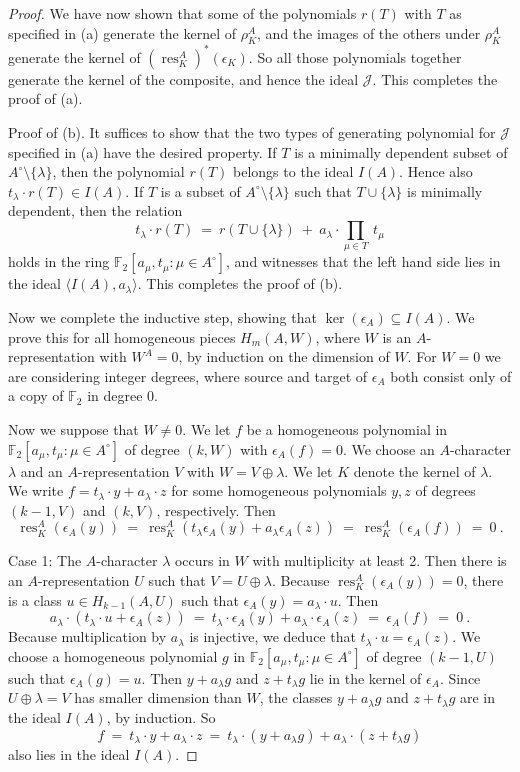 \documentclass[10pt,a4paper]{amsart}
\DeclareMathOperator{\res}{res}
\newcommand{\Jc}{{\mathcal J}}
\newcommand{\mF}{{\mathbb F}}
\newcommand{\td}[1]{\langle #1\rangle}
\begin{document}
\begin{proof}
  We have now shown that some of the polynomials $r(T)$ with $T$ as specified in (a)
  generate the kernel of $\rho^A_K$, and the images of the others under $\rho^A_K$
  generate the kernel of $(\res^A_K)^*(\epsilon_K)$. So all those polynomials
  together generate the kernel of the composite, and hence the ideal $\Jc$.
  This completes the proof of (a).\medskip

 
    Proof of (b). It suffices to show that the two types of generating polynomial for
  $\Jc$ specified in (a) have the desired property.
  If $T$ is a minimally dependent subset of $A^\circ\setminus\{\lambda\}$,
  then the polynomial $r(T)$ belongs to the ideal $I(A)$.
  Hence also  $t_\lambda\cdot r(T)\in I(A)$.
  If $T$ is a subset of $A^\circ\setminus\{\lambda\}$ such that
  $T\cup\{\lambda\}$ is minimally dependent, then the relation
  \[  t_\lambda \cdot r(T)\
    = \   r(T\cup\{\lambda\}) \ + \ a_\lambda \cdot {\prod}_{\mu\in T}\ t_\mu  \]
  holds in the ring $\mF_2[a_\mu,t_\mu\colon \mu\in A^\circ]$,
  and witnesses that the left hand side lies in the ideal $\td{I(A),a_\lambda}$.
  This completes the proof of (b).\medskip
  
  Now we complete the inductive step, showing that $\ker(\epsilon_A)\subseteq I(A)$.
  We prove this for all homogeneous pieces $H_m(A,W)$,
  where $W$ is an $A$-representation with $W^A=0$,
  by induction on the dimension of $W$.
  For $W=0$ we are considering integer degrees,
  where source and target of $\epsilon_A$ both
  consist only of a copy of $\mF_2$ in degree 0.
  
  Now we suppose that $W\ne 0$. 
  We let $f$ be a homogeneous polynomial in $\mF_2[a_\mu,t_\mu\colon  \mu\in A^\circ]$
  of degree $(k,W)$ with $\epsilon_A(f)=0$.
  We choose an $A$-character $\lambda$ and
  an $A$-representation $V$ with $W=V\oplus\lambda$.
  We let $K$ denote the kernel of $\lambda$.
  We write $f=t_\lambda\cdot y+a_\lambda\cdot z$ for some homogeneous polynomials $y,z$
  of degrees $(k-1,V)$ and $(k,V)$, respectively. Then
  \[
    \res^A_K(\epsilon_A(y))\ = \
    \res^A_K( t_\lambda\epsilon_A(y) + a_\lambda \epsilon_A(z))
    \ = \     \res^A_K( \epsilon_A(f))    \ = \ 0 \ . \]
  
  Case 1: The $A$-character $\lambda$ occurs in $W$ with multiplicity at least 2.
  Then there is an $A$-representation $U$ such that $V=U\oplus \lambda$.
  Because $\res^A_K(\epsilon_A(y))=0$, there is a class $u\in H_{k-1}(A,U)$
  such that $\epsilon_A(y)=a_\lambda\cdot u$.
  Then 
  \[ a_\lambda\cdot (t_\lambda\cdot u+\epsilon_A(z))\ =\
    t_\lambda\cdot\epsilon_A(y)+a_\lambda\cdot\epsilon_A(z)\ = \ \epsilon_A(f)\ =\ 0\ . \]
  Because multiplication by $a_\lambda$ is injective,
  we deduce that $t_\lambda\cdot u=\epsilon_A(z)$.
  We choose a homogeneous polynomial $g$ in $\mF_2[a_\mu,t_\mu\colon\mu\in A^\circ]$
  of degree $(k-1,U)$ such that $\epsilon_A(g)=u$.
  Then $y+a_\lambda g$ and $z+t_\lambda g$ lie in the kernel of $\epsilon_A$.
  Since $U\oplus\lambda=V$ has smaller dimension than $W$,
  the classes $y+a_\lambda g$ and $z+t_\lambda g$
  are in the ideal $I(A)$, by induction. So
  \[  f\ =\ t_\lambda\cdot y+a_\lambda\cdot z\ = \
    t_\lambda\cdot(y+a_\lambda g) +a_\lambda\cdot(z+t_\lambda g)  \]
  also lies in the ideal $I(A)$.\smallskip


\end{proof}
\end{document}
